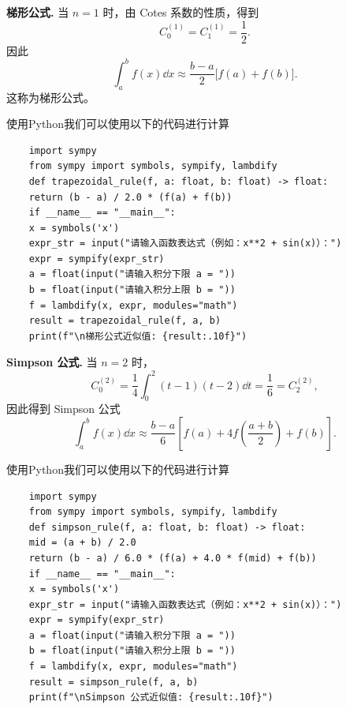 \begin{example}
	\textbf{梯形公式.}
	当 $n=1$ 时，由 Cotes 系数的性质，得到
	\[
	C_0^{(1)}=C_1^{(1)}=\frac12.
	\]因此
	\[
	\int_a^b f(x)\dd x
	\approx \frac{b-a}{2}\bigl[f(a)+f(b)\bigr].
	\]
	这称为梯形公式。
\end{example}
使用Python我们可以使用以下的代码进行计算
\begin{verbatim}
	import sympy
	from sympy import symbols, sympify, lambdify
	def trapezoidal_rule(f, a: float, b: float) -> float:
	return (b - a) / 2.0 * (f(a) + f(b))
	if __name__ == "__main__":
	x = symbols('x')
	expr_str = input("请输入函数表达式（例如：x**2 + sin(x)）：")
	expr = sympify(expr_str)
	a = float(input("请输入积分下限 a = "))
	b = float(input("请输入积分上限 b = "))
	f = lambdify(x, expr, modules="math")
	result = trapezoidal_rule(f, a, b)
	print(f"\n梯形公式近似值: {result:.10f}")
\end{verbatim}
\begin{example}
	\textbf{Simpson 公式.}
	当 $n=2$ 时，
	\[
	C_0^{(2)}=\frac14\int_0^2(t-1)(t-2)\dd t
	=\frac16=C_2^{(2)},
	\]
	因此得到 Simpson 公式
	\[
	\int_a^b f(x)\dd x
	\approx \frac{b-a}{6}
	\left[f(a)+4f\left(\frac{a+b}{2}\right)+f(b)\right].
	\]
\end{example}
使用Python我们可以使用以下的代码进行计算
\begin{verbatim}
	import sympy
	from sympy import symbols, sympify, lambdify
	def simpson_rule(f, a: float, b: float) -> float:
	mid = (a + b) / 2.0
	return (b - a) / 6.0 * (f(a) + 4.0 * f(mid) + f(b))
	if __name__ == "__main__":
	x = symbols('x')
	expr_str = input("请输入函数表达式（例如：x**2 + sin(x)）：")
	expr = sympify(expr_str)
	a = float(input("请输入积分下限 a = "))
	b = float(input("请输入积分上限 b = "))
	f = lambdify(x, expr, modules="math")
	result = simpson_rule(f, a, b)
	print(f"\nSimpson 公式近似值: {result:.10f}")
\end{verbatim}

